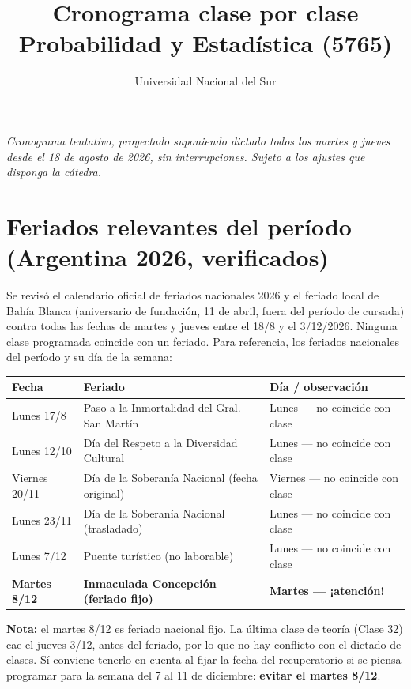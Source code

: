 \documentclass[11pt,a4paper]{article}
\title{Cronograma clase por clase \\ \large Probabilidad y Estadística (5765)}
\author{Universidad Nacional del Sur}
\date{}
\begin{document}
\maketitle
\vspace{-1.5em}

\begin{center}
\textit{Cronograma tentativo, proyectado suponiendo dictado todos los martes y jueves desde el 18 de agosto de 2026, sin interrupciones. Sujeto a los ajustes que disponga la cátedra.}
\end{center}
\vspace{1em}

\section*{Feriados relevantes del período (Argentina 2026, verificados)}

Se revisó el calendario oficial de feriados nacionales 2026 y el feriado local de Bahía Blanca (aniversario de fundación, 11 de abril, fuera del período de cursada) contra todas las fechas de martes y jueves entre el 18/8 y el 3/12/2026. Ninguna clase programada coincide con un feriado. Para referencia, los feriados nacionales del período y su día de la semana:

\begin{center}
\begin{tabular}{@{}lll@{}}
\toprule
\textbf{Fecha} & \textbf{Feriado} & \textbf{Día / observación} \\
\midrule
Lunes 17/8 & Paso a la Inmortalidad del Gral. San Martín & Lunes --- no coincide con clase \\
Lunes 12/10 & Día del Respeto a la Diversidad Cultural & Lunes --- no coincide con clase \\
Viernes 20/11 & Día de la Soberanía Nacional (fecha original) & Viernes --- no coincide con clase \\
Lunes 23/11 & Día de la Soberanía Nacional (trasladado) & Lunes --- no coincide con clase \\
Lunes 7/12 & Puente turístico (no laborable) & Lunes --- no coincide con clase \\
\textbf{Martes 8/12} & \textbf{Inmaculada Concepción (feriado fijo)} & \textbf{Martes --- ¡atención!} \\
\bottomrule
\end{tabular}
\end{center}

\vspace{0.5em}
\begin{center}
\parbox{0.9\textwidth}{\small \textbf{Nota:} el martes 8/12 es feriado nacional fijo. La última clase de teoría (Clase 32) cae el jueves 3/12, antes del feriado, por lo que no hay conflicto con el dictado de clases. Sí conviene tenerlo en cuenta al fijar la fecha del recuperatorio si se piensa programar para la semana del 7 al 11 de diciembre: \textbf{evitar el martes 8/12}.}
\end{center}
\end{document}
